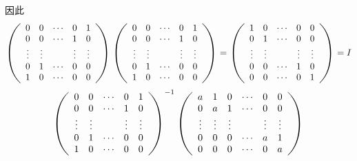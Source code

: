 \begin{enumerate}[1~]
\begin{enumerate}[1.~]
\begin{solution}
\begin{subproof}
\[\]
因此\[
\left( \begin{array} { c c c c c } { 0 } & { 0 } & { \cdots } & { 0 } & { 1 } \\ { 0 } & { 0 } & { \cdots } & { 1 } & { 0 } \\ { \vdots } & { \vdots } & { } & { \vdots } & { \vdots } \\ { 0 } & { 1 } & { \cdots } & { 0 } & { 0 } \\ { 1 } & { 0 } & { \cdots } & { 0 } & { 0 } \end{array} \right) \left( \begin{array} { c c c c c } { 0 } & { 0 } & { \cdots } & { 0 } & { 1 } \\ { 0 } & { 0 } & { \cdots } & { 1 } & { 0 } \\ { \vdots } & { \vdots } & { } & { \vdots } & { \vdots } \\ { 0 } & { 1 } & { \cdots } & { 0 } & { 0 } \\ { 1 } & { 0 } & { \cdots } & { 0 } & { 0 } \end{array} \right) = \left( \begin{array} { c c c c c } { 1 } & { 0 } & { \cdots } & { 0 } & { 0 } \\ { 0 } & { 1 } & { \cdots } & { 0 } & { 0 } \\ { \vdots } & { \vdots } & { } & { \vdots } & { \vdots } \\ { 0 } & { 0 } & { \cdots } & { 1 } & { 0 } \\ { 0 } & { 0 } & { \cdots } & { 0 } & { 1 } \end{array} \right) = I
\]
\[
\left( \begin{array} { c c c c c } { 0 } & { 0 } & { \cdots } & { 0 } & { 1 } \\ { 0 } & { 0 } & { \cdots } & { 1 } & { 0 } \\ { \vdots } & { \vdots } & { } & { \vdots } & { \vdots } \\ { 0 } & { 1 } & { \cdots } & { 0 } & { 0 } \\ { 1 } & { 0 } & { \cdots } & { 0 } & { 0 } \end{array} \right)^{-1}
\left( \begin{array} { c c c c c c } { a } & { 1 } &0& { \cdots } & { 0 } & { 0 } \\ { 0 } & { a } &1& { \cdots } & { 0 } & { 0 } \\ { \vdots } & { \vdots } &{ \vdots } & { } & { \vdots } & { \vdots } \\ { 0 } & { 0 } &0& { \cdots } & { a } & { 1 } \\ { 0 } & { 0 } &0& { \cdots } & { 0 } & { a } \end{array} \right)
\]
\end{subproof}
\end{solution}
\end{enumerate}
\end{enumerate}
